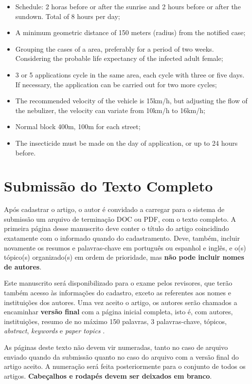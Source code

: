 \documentclass[a4paper,11pt]{article}
\begin{document}
\begin{itemize}
\item Schedule: 2 horas before or after the sunrise and 2 hours before or after the sundown. Total of 8 hours per day;
\item A minimum geometric distance of 150 meters (radius) from the notified case; 
\item Grouping the cases of a area, preferably for a period of two weeks. Considering the probable life expectancy of the infected adult female;
\item 3 or 5 applications cycle in the same area, each cycle with three or five days. If necessary, the application can be carried out for two more cycles;
\item The recommended velocity of the vehicle is 15km/h, but adjusting the flow of the nebulizer, the velocity can variate from 10km/h to 16km/h;
\item Normal block 400m, 100m for each street;
\item The insecticide must be made on the day of application, or up to 24 hours
  before.
\end{itemize}

\section{Submiss\~ao do Texto Completo}

Ap\'os cadastrar o artigo, o autor \'e convidado a carregar para o sistema de submiss\~ao um arquivo 
de termina\-\c c\~ao DOC ou PDF, com o texto completo. 
A primeira p\'agina desse manuscrito deve conter o t\'itulo do artigo coincidindo exatamente com o informado quando do cadastramento. 
Deve, tamb\'em, incluir novamente os resumos e palavras-chave em portugu\^es ou espanhol e ingl\^es, e o(s) t\'opico(s) organizado(s) 
em ordem de prioridade, mas \textbf{n\~ao pode incluir nomes de autores}.

Este manuscrito ser\'a disponibilizado para o exame pelos revisores, que ter\~ao tamb\'em acesso
 \`as informa\c c\~oes do cadastro, exceto as referentes aos nomes e institui\c c\~oes dos autores. 
Uma vez aceito o artigo, os autores ser\~ao chamados a encaminhar \textbf{vers\~ao final} com a p\'agina inicial completa, isto \'e, com autores, institui\c c\~oes, resumo de no m\'aximo 150 palavras, 3 palavras-chave, t\'opicos, \textit{abstract}, \textit{keywords} e \textit{paper topics} .

As p\'aginas deste texto n\~ao devem vir numeradas, tanto no caso de arquivo enviado quando da submiss\~ao quanto no caso do arquivo com a vers\~ao final do artigo aceito. 
A numera\c c\~ao ser\'a feita posteriormente para o conjunto de todos os artigos.
\textbf{Cabe\c calhos e rodap\'es devem ser deixados em branco}.
\end{document}
